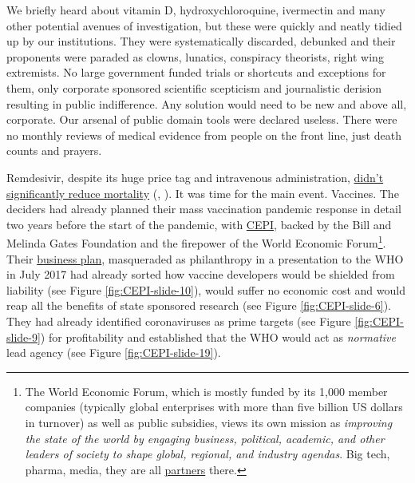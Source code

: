 \documentclass[11pt,a4paper,notitlepage]{report}
\begin{document}
We briefly heard about vitamin D, hydroxychloroquine, ivermectin and many other potential avenues of investigation, but these were quickly and neatly tidied up by our institutions. They were systematically discarded, debunked and their proponents were paraded as clowns, lunatics, conspiracy theorists, right wing extremists. No large government funded trials or shortcuts and exceptions for them, only corporate sponsored scientific scepticism and journalistic derision resulting in public indifference. Any solution would need to be new and above all, corporate. Our arsenal of public domain tools were declared useless. There were no monthly reviews of medical evidence from people on the front line, just death counts and prayers.

Remdesivir, despite its huge price tag and intravenous administration, \href{https://www.thelancet.com/journals/laninf/article/ PIIS1473-3099(21)00485-0/fulltext}{didn’t significantly reduce mortality} (\cite{Ader21}, \cite{Yan2021-pc}). It was time for the main event. Vaccines. The deciders had already planned their mass vaccination pandemic response in detail two years before the start of the pandemic, with \href{https://cepi.net/news_cepi/global-partnership-launched-to-prevent-epidemics-with-new-vaccines/}{CEPI}, backed by the Bill and Melinda Gates Foundation and the firepower of the World Economic Forum\footnote{The World Economic Forum, which is mostly funded by its 1,000 member companies (typically global enterprises with more than five billion US dollars in turnover) as well as public subsidies, views its own mission as \textit{improving the state of the world by engaging business, political, academic, and other leaders of society to shape global, regional, and industry agendas}. Big tech, pharma, media, they are all \href{https://www.weforum.org/partners}{partners} there.}. Their \href{https://www.who.int/medicines/ebola-treatment/TheCoalitionEpidemicPreparednessInnovations-an-overview.pdf}{business plan}, masqueraded as philanthropy in a presentation to the WHO in July 2017 \cite{cepi072017} had already sorted how vaccine developers would be shielded from liability (see Figure \ref{fig:CEPI-slide-10}), would suffer no economic cost and would reap all the benefits of state sponsored research (see Figure \ref{fig:CEPI-slide-6}). They had already identified coronaviruses as prime targets (see Figure \ref{fig:CEPI-slide-9}) for profitability and established that the WHO would act as \textit{normative} lead agency (see Figure \ref{fig:CEPI-slide-19}).
\end{document}
